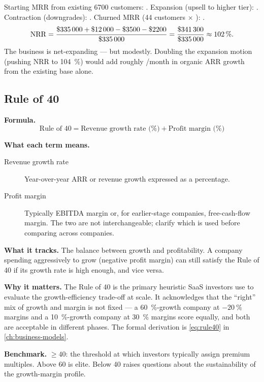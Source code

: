 \begin{example}
Starting MRR from existing \num{6700} customers: . Expansion (upsell to higher
tier): . Contraction (downgrades): . Churned MRR (44 customers $\times$
): .
\[
  \mathrm{NRR} = \frac{\$\num{335000} + \$\num{12000} - \$\num{3500} - \$\num{2200}}
    {\$\num{335000}}
  = \frac{\$\num{341300}}{\$\num{335000}} \approx \qty{102}{\percent}.
\]
The business is net-expanding --- but modestly. Doubling the expansion motion (pushing NRR
to \qty{104}{\percent}) would add roughly /month in organic ARR growth from
the existing base alone.
\end{example}


\subsection{Rule of 40}

\textbf{Formula.}
\[
  \text{Rule of 40} = \text{Revenue growth rate (\%)} + \text{Profit margin (\%)}
\]

\textbf{What each term means.}
\begin{description}
  \item[Revenue growth rate] Year-over-year ARR or revenue growth expressed as a percentage.
  \item[Profit margin] Typically EBITDA margin or, for earlier-stage companies, free-cash-flow
    margin. The two are not interchangeable; clarify which is used before comparing across
    companies.
\end{description}

\textbf{What it tracks.} The balance between growth and profitability. A company spending
aggressively to grow (negative profit margin) can still satisfy the Rule of 40 if its growth
rate is high enough, and vice versa.

\textbf{Why it matters.} The Rule of 40 is the primary heuristic SaaS investors use to
evaluate the growth-efficiency trade-off at scale. It acknowledges that the ``right'' mix of
growth and margin is not fixed --- a \qty{60}{\percent}-growth company at $-\qty{20}{\percent}$
margins and a \qty{10}{\percent}-growth company at \qty{30}{\percent} margins score equally,
and both are acceptable in different phases. The formal derivation is \cref{eq:rule40} in
\cref{ch:business-models}.

\textbf{Benchmark.} $\ge 40$: the threshold at which investors typically assign premium
multiples. Above 60 is elite. Below 40 raises questions about the sustainability of the
growth-margin profile.

